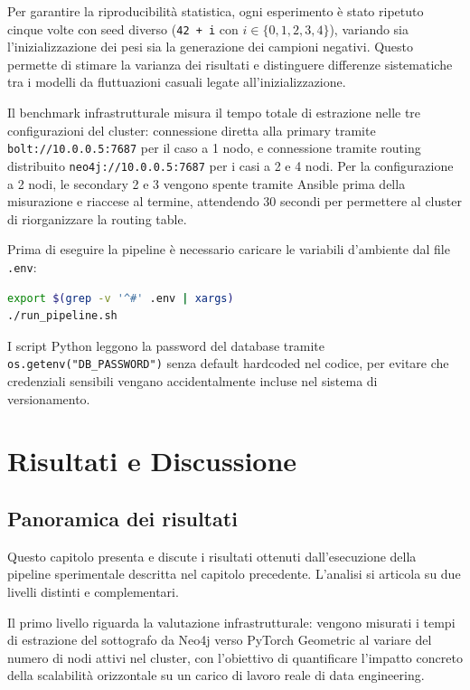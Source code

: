 Per garantire la riproducibilità statistica, ogni esperimento è stato ripetuto cinque volte con seed diverso (\texttt{42 + i} con $i \in \{0, 1, 2, 3, 4\}$), variando sia l'inizializzazione dei pesi sia la generazione dei campioni negativi. Questo permette di stimare la varianza dei risultati e distinguere differenze sistematiche tra i modelli da fluttuazioni casuali legate all'inizializzazione.

Il benchmark infrastrutturale misura il tempo totale di estrazione nelle tre configurazioni del cluster: connessione diretta alla primary tramite \texttt{bolt://10.0.0.5:7687} per il caso a 1 nodo, e connessione tramite routing distribuito \texttt{neo4j://10.0.0.5:7687} per i casi a 2 e 4 nodi. Per la configurazione a 2 nodi, le secondary 2 e 3 vengono spente tramite Ansible prima della misurazione e riaccese al termine, attendendo 30 secondi per permettere al cluster di riorganizzare la routing table.

Prima di eseguire la pipeline è necessario caricare le variabili d'ambiente dal file \texttt{.env}:

\begin{lstlisting}[language=bash, caption={Esecuzione della pipeline completa}]
export $(grep -v '^#' .env | xargs)
./run_pipeline.sh
\end{lstlisting}

I script Python leggono la password del database tramite \texttt{os.getenv("DB\_PASSWORD")} senza default hardcoded nel codice, per evitare che credenziali sensibili vengano accidentalmente incluse nel sistema di versionamento.








{\chapter{Risultati e Discussione}}
\label{sec:results}

\section{Panoramica dei risultati}

Questo capitolo presenta e discute i risultati ottenuti dall'esecuzione della pipeline sperimentale descritta nel capitolo precedente. L'analisi si articola su due livelli distinti e complementari.

Il primo livello riguarda la valutazione infrastrutturale: vengono misurati i tempi di estrazione del sottografo da Neo4j verso PyTorch Geometric al variare del numero di nodi attivi nel cluster, con l'obiettivo di quantificare l'impatto concreto della scalabilità orizzontale su un carico di lavoro reale di data engineering.

